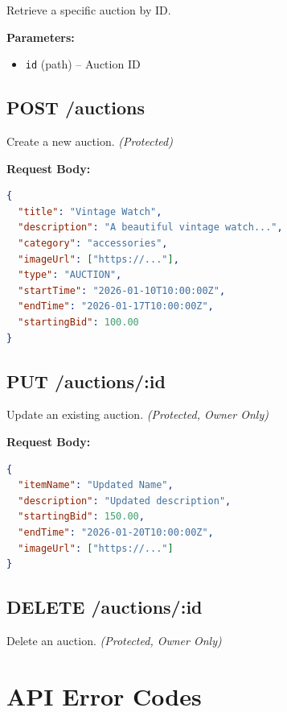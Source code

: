 \documentclass[12pt,a4paper]{report}
\begin{document}
Retrieve a specific auction by ID.

\textbf{Parameters:}
\begin{itemize}
    \item \texttt{id} (path) -- Auction ID
\end{itemize}

\subsection{POST /auctions}

Create a new auction. \textit{(Protected)}

\textbf{Request Body:}
\begin{lstlisting}[language=json]
{
  "title": "Vintage Watch",
  "description": "A beautiful vintage watch...",
  "category": "accessories",
  "imageUrl": ["https://..."],
  "type": "AUCTION",
  "startTime": "2026-01-10T10:00:00Z",
  "endTime": "2026-01-17T10:00:00Z",
  "startingBid": 100.00
}
\end{lstlisting}

\subsection{PUT /auctions/:id}

Update an existing auction. \textit{(Protected, Owner Only)}

\textbf{Request Body:}
\begin{lstlisting}[language=json]
{
  "itemName": "Updated Name",
  "description": "Updated description",
  "startingBid": 150.00,
  "endTime": "2026-01-20T10:00:00Z",
  "imageUrl": ["https://..."]
}
\end{lstlisting}

\subsection{DELETE /auctions/:id}

Delete an auction. \textit{(Protected, Owner Only)}

\section{API Error Codes}
\end{document}
